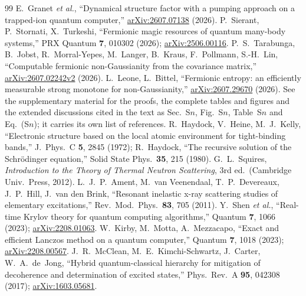 \begin{thebibliography}{99}
 E.~Granet \emph{et al.}, ``Dynamical structure factor with a pumping approach on a trapped-ion quantum computer,'' \href{https://arxiv.org/abs/2607.07138}{arXiv:2607.07138} (2026).
 P.~Sierant, P.~Stornati, X.~Turkeshi, ``Fermionic magic resources of quantum many-body systems,'' PRX Quantum \textbf{7}, 010302 (2026); \href{https://arxiv.org/abs/2506.00116}{arXiv:2506.00116}.
 P.~S.~Tarabunga, B.~Jobst, R.~Morral-Yepes, M.~Langer, B.~Kraus, F.~Pollmann, S.-H.~Lin, ``Computable fermionic non-Gaussianity from the covariance matrix,'' \href{https://arxiv.org/abs/2607.02242v2}{arXiv:2607.02242v2} (2026).
 L.~Leone, L.~Bittel, ``Fermionic entropy: an efficiently measurable strong monotone for non-Gaussianity,'' \href{https://arxiv.org/abs/2607.29670}{arXiv:2607.29670} (2026).
 See the supplementary material for the proofs, the complete tables and figures and the extended discussions cited in the text as Sec.~S$n$, Fig.~S$n$, Table~S$n$ and Eq.~(S$n$); it carries its own list of references.
 R.~Haydock, V.~Heine, M.~J.~Kelly, ``Electronic structure based on the local atomic environment for tight-binding bands,'' J.\ Phys.\ C \textbf{5}, 2845 (1972); R.~Haydock, ``The recursive solution of the Schr\"odinger equation,'' Solid State Phys.\ \textbf{35}, 215 (1980).
 G.~L.~Squires, \emph{Introduction to the Theory of Thermal Neutron Scattering}, 3rd ed.\ (Cambridge Univ.\ Press, 2012).
 L.~J.~P.~Ament, M.~van Veenendaal, T.~P.~Devereaux, J.~P.~Hill, J.~van den Brink, ``Resonant inelastic x-ray scattering studies of elementary excitations,'' Rev.\ Mod.\ Phys.\ \textbf{83}, 705 (2011).
 Y.~Shen \emph{et al.}, ``Real-time Krylov theory for quantum computing algorithms,'' Quantum \textbf{7}, 1066 (2023); \href{https://arxiv.org/abs/2208.01063}{arXiv:2208.01063}.
 W.~Kirby, M.~Motta, A.~Mezzacapo, ``Exact and efficient Lanczos method on a quantum computer,'' Quantum \textbf{7}, 1018 (2023); \href{https://arxiv.org/abs/2208.00567}{arXiv:2208.00567}.
 J.~R.~McClean, M.~E.~Kimchi-Schwartz, J.~Carter, W.~A.~de~Jong, ``Hybrid quantum-classical hierarchy for mitigation of decoherence and determination of excited states,'' Phys.\ Rev.\ A \textbf{95}, 042308 (2017); \href{https://arxiv.org/abs/1603.05681}{arXiv:1603.05681}.

\end{thebibliography}
